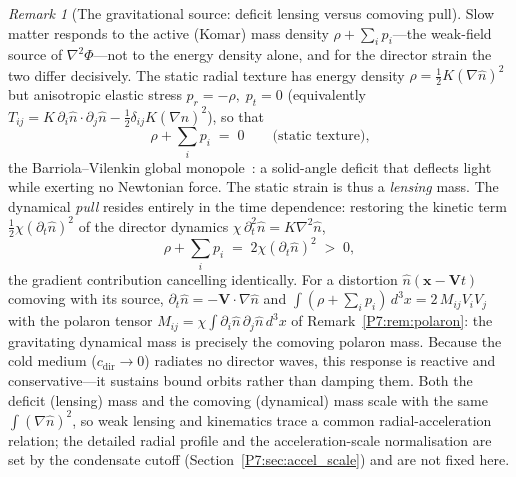 \documentclass[11pt,a4paper]{article}
\theoremstyle{definition}
\theoremstyle{remark}
\newtheorem{remark}[theorem]{Remark}
\begin{document}
\begin{remark}[The gravitational source: deficit lensing versus comoving pull]
\label{P7:rem:active_mass}
Slow matter responds to the active (Komar) mass density
$\rho+\sum_i p_i$---the weak-field source of $\nabla^2\Phi$---not to the
energy density alone, and for the director strain the two differ
decisively.  The static radial texture has energy density
$\rho=\tfrac12 K(\nabla\hat n)^2$ but anisotropic elastic stress
$p_r=-\rho,\;p_t=0$ (equivalently
$T_{ij}=K\,\partial_i\hat n\!\cdot\!\partial_j\hat n
       -\tfrac12\delta_{ij}K(\nabla\hat n)^2$), so that
\begin{equation}
  \rho+\sum_i p_i \;=\; 0 \qquad\text{(static texture),}
  \label{P7:eq:monopole}
\end{equation}
the Barriola--Vilenkin global monopole~\cite{BarriolaVilenkin1989}: a
solid-angle deficit that deflects light while exerting no Newtonian
force.  The static strain is thus a \emph{lensing} mass.  The dynamical
\emph{pull} resides entirely in the time dependence: restoring the
kinetic term $\tfrac12\chi(\partial_t\hat n)^2$ of the director dynamics
$\chi\,\partial_t^2\hat n=K\nabla^2\hat n$,
\begin{equation}
  \rho+\sum_i p_i \;=\; 2\chi(\partial_t\hat n)^2 \;>\;0,
  \label{P7:eq:kinetic_mass}
\end{equation}
the gradient contribution cancelling identically.  For a distortion
$\hat n(\mathbf x-\mathbf V t)$ comoving with its source,
$\partial_t\hat n=-\mathbf V\!\cdot\!\nabla\hat n$ and
$\int(\rho+\sum_i p_i)\,d^3x = 2\,M_{ij}V_iV_j$ with the polaron tensor
$M_{ij}=\chi\int\partial_i\hat n\,\partial_j\hat n\,d^3x$ of
Remark~\ref{P7:rem:polaron}: the gravitating dynamical mass is precisely
the comoving polaron mass.  Because the cold medium
($c_{\mathrm{dir}}\to0$) radiates no director waves, this response is
reactive and conservative---it sustains bound orbits rather than damping
them.  Both the deficit (lensing) mass and the comoving (dynamical) mass
scale with the same $\int(\nabla\hat n)^2$, so weak lensing and
kinematics trace a common radial-acceleration relation; the detailed
radial profile and the acceleration-scale normalisation are set by the
condensate cutoff (Section~\ref{P7:sec:accel_scale}) and are not fixed
here.
\end{remark}
\end{document}
